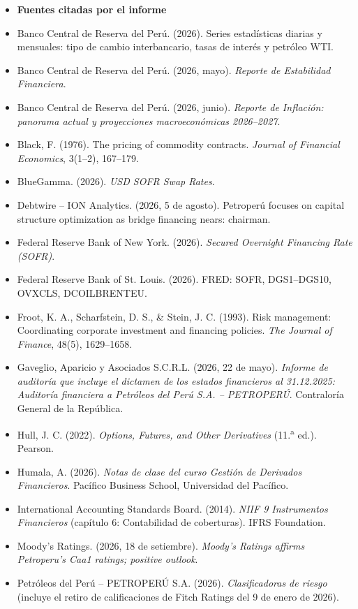 \begin{itemize}[leftmargin=1em,itemsep=4pt]
\item[] \textbf{Fuentes citadas por el informe}
\item Banco Central de Reserva del Perú. (2026). Series estadísticas diarias y mensuales: tipo de cambio interbancario, tasas de interés y petróleo WTI.
\item Banco Central de Reserva del Perú. (2026, mayo). \emph{Reporte de Estabilidad Financiera}.
\item Banco Central de Reserva del Perú. (2026, junio). \emph{Reporte de Inflación: panorama actual y proyecciones macroeconómicas 2026--2027}.
\item Black, F. (1976). The pricing of commodity contracts. \emph{Journal of Financial Economics}, 3(1--2), 167--179.
\item BlueGamma. (2026). \emph{USD SOFR Swap Rates}.
\item Debtwire -- ION Analytics. (2026, 5 de agosto). Petroperú focuses on capital structure optimization as bridge financing nears: chairman.
\item Federal Reserve Bank of New York. (2026). \emph{Secured Overnight Financing Rate (SOFR)}.
\item Federal Reserve Bank of St. Louis. (2026). FRED: SOFR, DGS1--DGS10, OVXCLS, DCOILBRENTEU.
\item Froot, K. A., Scharfstein, D. S., \& Stein, J. C. (1993). Risk management: Coordinating corporate investment and financing policies. \emph{The Journal of Finance}, 48(5), 1629--1658.
\item Gaveglio, Aparicio y Asociados S.C.R.L. (2026, 22 de mayo). \emph{Informe de auditoría que incluye el dictamen de los estados financieros al 31.12.2025: Auditoría financiera a Petróleos del Perú S.A. -- PETROPERÚ}. Contraloría General de la República.
\item Hull, J. C. (2022). \emph{Options, Futures, and Other Derivatives} (11.\textsuperscript{a} ed.). Pearson.
\item Humala, A. (2026). \emph{Notas de clase del curso Gestión de Derivados Financieros}. Pacífico Business School, Universidad del Pacífico.
\item International Accounting Standards Board. (2014). \emph{NIIF 9 Instrumentos Financieros} (capítulo 6: Contabilidad de coberturas). IFRS Foundation.
\item Moody's Ratings. (2026, 18 de setiembre). \emph{Moody's Ratings affirms Petroperu's Caa1 ratings; positive outlook}.
\item Petróleos del Perú -- PETROPERÚ S.A. (2026). \emph{Clasificadoras de riesgo} (incluye el retiro de calificaciones de Fitch Ratings del 9 de enero de 2026).

\end{itemize}
